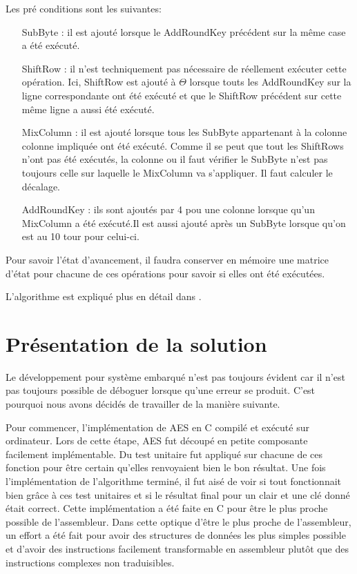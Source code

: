 \documentclass[letterpaper]{article}
\begin{document}
Les pré conditions sont les suivantes:
\begin{itemize}
    \item[SubByte :] il est ajouté lorsque le AddRoundKey précédent sur la même case a été exécuté.
    \item[ShiftRow :] il n'est techniquement pas nécessaire de réellement exécuter cette opération. Ici, ShiftRow est ajouté à $\Theta$ lorsque touts les AddRoundKey sur la ligne correspondante ont été exécuté et que le ShiftRow précédent sur cette même ligne a aussi été exécuté.
    \item[MixColumn :] il est ajouté lorsque tous les SubByte appartenant à la colonne colonne impliquée ont été exécuté. Comme il se peut que tout les ShiftRows n'ont pas été exécutés, la colonne ou il faut vérifier le SubByte n'est pas toujours celle sur laquelle le MixColumn va s'appliquer. Il faut calculer le décalage.
    \item[AddRoundKey :] ils sont ajoutés par 4 pou une colonne lorsque qu'un MixColumn a été exécuté.Il est aussi ajouté après un SubByte lorsque qu'on est au 10 tour pour celui-ci.
\end{itemize}

Pour savoir l'état d'avancement, il faudra conserver en mémoire une matrice d'état pour chacune de ces opérations pour savoir si elles ont été exécutées.

L'algorithme est expliqué plus en détail dans \cite{FernandesMedeiros2012}.

\section{Présentation de la solution}
Le développement pour système embarqué n'est pas toujours évident car il n'est pas toujours possible de déboguer lorsque qu'une erreur se produit.
C'est pourquoi nous avons décidés de travailler de la manière suivante.

Pour commencer, l'implémentation de AES en C compilé et exécuté sur ordinateur.
Lors de cette étape, AES fut découpé en petite composante facilement implémentable.
Du test unitaire fut appliqué sur chacune de ces fonction pour être certain qu'elles renvoyaient bien le bon résultat.
Une fois l'implémentation de l'algorithme terminé, il fut aisé de voir si tout fonctionnait bien grâce à ces test unitaires et si le résultat final pour un clair et une clé donné était correct.
Cette implémentation a été faite en C pour être le plus proche possible de l'assembleur.
Dans cette optique d'être le plus proche de l'assembleur, un effort a été fait pour avoir des structures de données les plus simples possible et d'avoir des instructions facilement transformable en assembleur plutôt que des instructions complexes non traduisibles.
\end{document}
